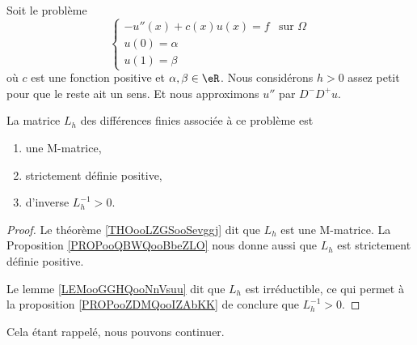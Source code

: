 \begin{proposition}     \label{PROPooOQJVooJMTkVM}
    Soit le problème
    \begin{equation}                \label{EQooEUHQooWHRelr}
         \begin{cases}
             -u''(x)+c(x)u(x)=f    &   \text{sur } \Omega\\
             u(0)=\alpha\\
             u(1)=\beta
         \end{cases}
    \end{equation}
    où \( c\) est une fonction positive et \( \alpha,\beta\in \eR\). Nous considérons \( h>0\) assez petit pour que le reste ait un sens. Et nous approximons \( u''\) par \( D^-D^+u\).  

    La matrice \( L_h\) des différences finies associée à ce problème est 
    \begin{enumerate}
        \item
            une M-matrice,
        \item
            strictement définie positive,
        \item
             d'inverse \( L_h^{-1}>0\).
    \end{enumerate}
\end{proposition}

\begin{proof}
    Le théorème \ref{THOooLZGSooSevggj} dit que \( L_h\) est une M-matrice. La Proposition \ref{PROPooQBWQooBbeZLO} nous donne aussi que \( L_h\) est strictement définie positive.

    Le lemme \ref{LEMooGGHQooNnVsuu} dit que \( L_h\) est irréductible, ce qui permet à la proposition \ref{PROPooZDMQooIZAbKK} de conclure que \( L_h^{-1}>0\).
\end{proof}



Cela étant rappelé, nous pouvons continuer.

